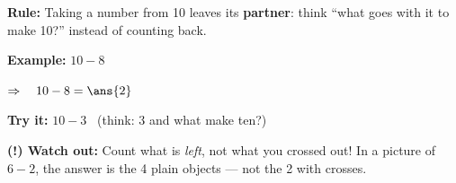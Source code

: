 \documentclass[12pt]{article}
\begin{document}

\begin{formulabox}
\textbf{Rule:} Taking a number from 10 leaves its \textbf{partner}: think
``what goes with it to make 10?'' instead of counting back.
\end{formulabox}

\begin{examplebox}
\textbf{Example:} \quad $10 - 8$

$\Rightarrow\quad 10 - 8 = \ans{2}$
\end{examplebox}

\begin{tryitbox}
\textbf{Try it:} \quad $10 - 3$ \ (think: 3 and what make ten?)\\[2pt]
\end{tryitbox}

\begin{watchoutbox}
\textbf{(!) Watch out:} Count what is \emph{left}, not what you crossed out!
In a picture of $6-2$, the answer is the 4 plain objects --- not the 2 with
crosses.
\end{watchoutbox}
\end{document}
